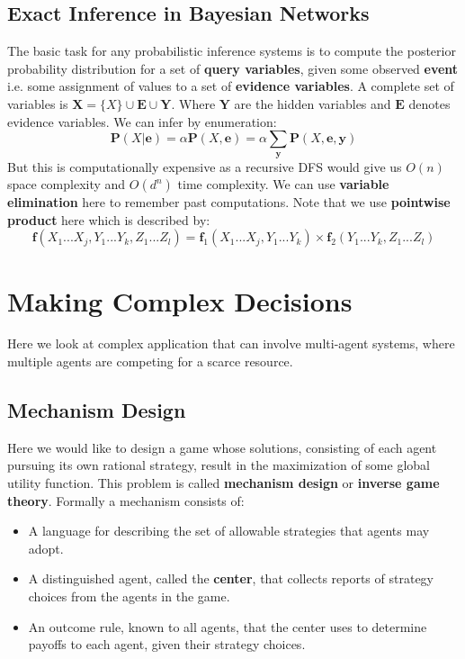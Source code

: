 \documentclass[twoside]{article}
\begin{document}
\subsection{Exact Inference in Bayesian Networks}
The basic task for any probabilistic inference systems is to compute the 
posterior probability distribution for a set of \textbf{query variables}, given 
some observed \textbf{event} i.e. some assignment of values to a set of 
\textbf{evidence variables}. A complete set of variables is \(\mathbf X=\{X\} \cup \mathbf E \cup \mathbf Y\).
Where \(\mathbf Y\) are the hidden variables and \(\mathbf E\) denotes evidence 
variables. We can infer by enumeration:
\begin{equation}
        \mathbf P(X|\mathbf e) = \alpha \mathbf P(X,\mathbf e) = \alpha \sum_{\mathbf y} \mathbf P(X,\mathbf e,\mathbf y)
\end{equation}
But this is computationally expensive as a recursive DFS would give us \(O(n)\)
space complexity and \(O(d^n)\) time complexity. We can use \textbf{variable
elimination} here to remember past computations. Note that we use \textbf{pointwise
product} here which is described by:
\begin{equation}
        \mathbf f(X_1...X_j,Y_1...Y_k,Z_1...Z_l)=\mathbf f_1(X_1...X_j,Y_1...Y_k)\times \mathbf f_2(Y_1...Y_k,Z_1...Z_l)
\end{equation}
\section{Making Complex Decisions}
Here we look at complex application that can involve multi-agent systems, where 
multiple agents are competing for a scarce resource.
\subsection{Mechanism Design}
Here we would like to design a game whose solutions, consisting of each agent 
pursuing its own rational strategy, result in the maximization of some global 
utility function. This problem is called \textbf{mechanism design} or \textbf{
inverse game theory}. Formally a mechanism consists of:
\begin{itemize}
        \item A language for describing the set of allowable strategies that 
        agents may adopt.
        \item A distinguished agent, called the \textbf{center}, that collects 
        reports of strategy choices from the agents in the game.
        \item An outcome rule, known to all agents, that the center uses to 
        determine payoffs to each agent, given their strategy choices.
\end{itemize}
\end{document}
